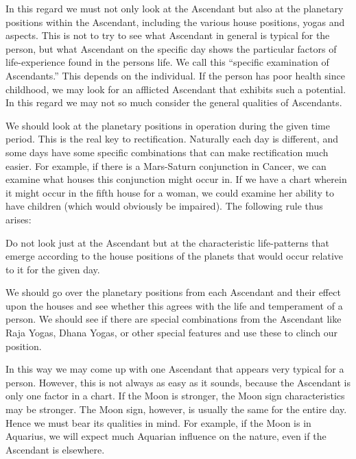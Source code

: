  

In this regard we must not only look at the Ascendant but also at the planetary positions within the Ascendant, including the various house positions, yogas and aspects. This is not to try to see what Ascendant in general is typical for the person, but what Ascendant on the specific day shows the particular factors of life-experience found in the persons life. We call this “specific examination of Ascendants.” This depends on the individual. If the person has poor health since childhood, we may look for an afflicted Ascendant that exhibits such a potential. In this regard we may not so much consider the general qualities of Ascendants.

 

We should look at the planetary positions in operation during the given time period. This is the real key to rectification. Naturally each day is different, and some days have some specific combinations that can make rectification much easier. For example, if there is a Mars-Saturn conjunction in Cancer, we can examine what houses this conjunction might occur in. If we have a chart wherein it might occur in the fifth house for a woman, we could examine her ability to have children (which would obviously be impaired). The following rule thus arises:

 

Do not look just at the Ascendant but at the characteristic life-patterns that emerge according to the house positions of the planets that would occur relative to it for the given day.
 

We should go over the planetary positions from each Ascendant and their effect upon the houses and see whether this agrees with the life and temperament of a person. We should see if there are special combinations from the Ascendant like Raja Yogas, Dhana Yogas, or other special features and use these to clinch our position.

 


 

In this way we may come up with one Ascendant that appears very typical for a person. However, this is not always as easy as it sounds, because the Ascendant is only one factor in a chart. If the Moon is stronger, the Moon sign characteristics may be stronger. The Moon sign, however, is usually the same for the entire day. Hence we must bear its qualities in mind. For example, if the Moon is in Aquarius, we will expect much Aquarian influence on the nature, even if the Ascendant is elsewhere.

